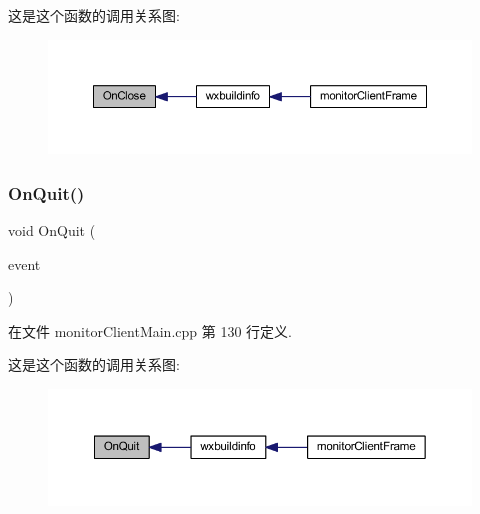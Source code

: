 这是这个函数的调用关系图\+:\nopagebreak
\begin{figure}[H]
\begin{center}
\leavevmode
\includegraphics[width=350pt]{classmonitor_client_frame_aa744f336117172b7ab41864141a1ed2d_icgraph}
\end{center}
\end{figure}
\mbox{\label{classmonitor_client_frame_a62c5559e9a3d4da08a0d6705baa47b95}} 
\subsubsection{\texorpdfstring{On\+Quit()}{OnQuit()}}
{\footnotesize\ttfamily void On\+Quit (\begin{DoxyParamCaption}\item[{wx\+Command\+Event \&}]{event }\end{DoxyParamCaption})\hspace{0.3cm}{\ttfamily [private]}}



在文件 monitor\+Client\+Main.\+cpp 第 130 行定义.

这是这个函数的调用关系图\+:\nopagebreak
\begin{figure}[H]
\begin{center}
\leavevmode
\includegraphics[width=350pt]{classmonitor_client_frame_a62c5559e9a3d4da08a0d6705baa47b95_icgraph}
\end{center}
\end{figure}
\mbox{\label{classmonitor_client_frame_a566bd9bdaa3933a188c130b6d6a166b5}} 
